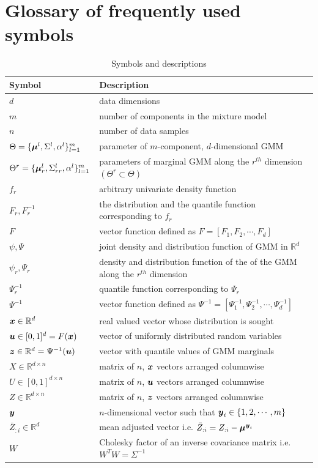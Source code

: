 \documentclass{article}
\theoremstyle{plain}
\theoremstyle{definition}
\theoremstyle{remark}
\begin{document}
\newpage
\appendix
\onecolumn
\section{Glossary of frequently used symbols} \label{apd:symbol_glossary}
\begin{table}[h]
\caption{Symbols and descriptions}
\label{tab:symbol_glossary}
\begin{tabular}{ll}
\hline
\textbf{Symbol} & \textbf{Description} \\
\hline
$d$ & data dimensions \\
$m$ & number of components in the mixture model \\
$n$ & number of data samples \\
$\Theta = \{\boldsymbol{\mu}^l, \Sigma^l, \alpha^l\}_{l=1}^m$ & parameter of $m$-component, $d$-dimensional GMM \\
$\Theta^r= \{\boldsymbol{\mu}_r^l, \Sigma_{rr}^l, \alpha^l\}_{l=1}^m$ & parameters of marginal GMM along the $r^{th}$ dimension $(\Theta^r \subset \Theta)$ \\
$f_r $ & arbitrary univariate density function \\
$F_r, F_r^{-1}$ & the distribution and the quantile function corresponding to $f_r$ \\
$F$ & vector function defined as $F = [F_1, F_2,\cdots,F_d]$ \\
$\psi, \Psi$ & joint density and distribution function of GMM in $\mathbb{R}^d$ \\
$\psi_r , \Psi_r$ & density and distribution function of the of the GMM along the $r^{th}$ dimension \\
$\Psi_r^{-1}$ & quantile function corresponding to $\Psi_r$ \\
$\Psi^{-1}$ & vector function defined as $\Psi^{-1} = [\Psi_1^{-1}, \Psi_2^{-1},\cdots,\Psi_d^{-1}]$ \\
$\boldsymbol{x} \in \mathbb{R}^d$ & real valued vector whose distribution is sought \\
$\boldsymbol{u} \in [0,1]^d=F(\boldsymbol{x})$ &  vector of uniformly distributed random variables \\
$\boldsymbol{z} \in \mathbb{R}^d =\Psi^{-1}(\boldsymbol{u}) $ &  vector with quantile values of GMM marginals \\
$X \in \mathbb{R}^{d \times n}$ & matrix of $n$, $\boldsymbol{x}$ vectors arranged columnwise \\
$U \in [0,1]^{d \times n}$ & matrix of $n$, $\boldsymbol{u}$ vectors arranged columnwise \\
$Z \in \mathbb{R}^{d \times n}$ & matrix of $n$, $\boldsymbol{z}$ vectors arranged columnwise \\
$\boldsymbol{y}$ & $n$-dimensional vector such that $\boldsymbol{y}_i \in \{1,2,\cdots,m\}$ \\
$\bar{Z}_{:i} \in \mathbb{R}^d$ & mean adjusted vector i.e. $\bar{Z}_{:i} = Z_{:i} - \boldsymbol{\mu}^{\boldsymbol{y}_i}$ \\
$W $ & Cholesky factor of an inverse covariance matrix i.e. $W^TW=\Sigma^{-1}$ \\
\hline
\end{tabular}
\end{table}
\end{document}

